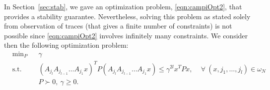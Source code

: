 In Section~\ref{sec:stab}, we gave an optimization problem, \eqref{eqn:campiOpt2}, that provides a stability guarantee. Nevertheless, solving this problem as stated solely from observation of traces (that gives a finite number of constraints) is not possible since \eqref{eqn:campiOpt2} involves infinitely many constraints. We consider then the following optimization problem:
\begin{equation}\label{eq:lowerbound}
\begin{aligned}
& \text{min}_P & & \gamma \\
& \text{s.t.} 
&  & (A_{j_l} A_{j_{l-1}} \dots A_{j_1} x)^T P (A_{j_l} A_{j_{l-1}} \dots A_{j_1} x) \leq \gamma^{2l} x^T P x, \,  \quad \forall\ (x, j_1,\dots, j_l) \in \omega_N\\
& && P \succ 0,\ \gamma \geq 0. \\
\end{aligned}
\end{equation}

